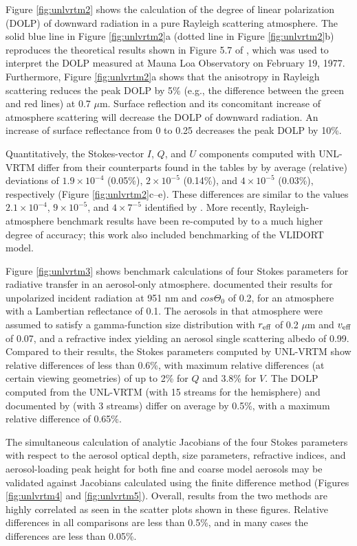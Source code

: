 Figure \ref{fig:unlvrtm2} shows the calculation of the degree of linear 
polarization (DOLP) of downward radiation in a pure Rayleigh scattering 
atmosphere. The solid blue line in Figure \ref{fig:unlvrtm2}a (dotted 
line in Figure \ref{fig:unlvrtm2}b) reproduces the theoretical results 
shown in Figure 5.7 of \citet{Coulson88}, which was used to interpret 
the DOLP measured at Mauna Loa Observatory on February 19, 1977. 
Furthermore, Figure \ref{fig:unlvrtm2}a shows that the anisotropy in
Rayleigh scattering reduces the peak DOLP by 5\% (e.g., the difference
between the green and red lines) at 0.7 $\mu$m. Surface reflection and its
concomitant increase of atmosphere scattering will decrease the DOLP of
downward radiation. An increase of surface reflectance from 0 to 0.25
decreases the peak DOLP by 10\%.

Quantitatively, the Stokes-vector $I$, $Q$, and $U$ components computed with
UNL-VRTM differ from their counterparts found in the tables by
\citet{Coulson60} by average (relative) deviations of $1.9\times 10^{-4}$
(0.05\%), $2\times 10^{-5}$ (0.14\%), and $4\times 10^{-5}$ (0.03\%), 
respectively (Figure \ref{fig:unlvrtm2}c--e). These
differences are similar to the values $2.1\times 10^{-4}$, $9\times
10^{-5}$, and $4\times 7^{-5}$ identified by \citet{Evans91}. More recently,
Rayleigh-atmosphere benchmark results have been re-computed by
\citet{Vijay12} to a much higher degree of accuracy; this work also
included benchmarking of the VLIDORT model.

Figure \ref{fig:unlvrtm3} shows benchmark calculations of four 
Stokes parameters for radiative transfer in an aerosol-only atmosphere.
\citet{Garcia89} documented their results for unpolarized incident 
radiation at 951 nm and $cos{\Theta_0}$ of 0.2, for an atmosphere with a
Lambertian reflectance of 0.1. The aerosols in that atmosphere were
assumed to satisfy a gamma-function size distribution with $r_\text{eff}$ of
0.2 $\mu$m and $v_\text{eff}$ of 0.07, and a refractive index yielding an 
aerosol single scattering albedo of 0.99. Compared to their results, 
the Stokes parameters computed by UNL-VRTM show relative differences 
of less than 0.6\%, with maximum relative differences 
(at certain viewing geometries) of up to 2\% for $Q$ and 3.8\% for $V$. 
The DOLP computed from the UNL-VRTM (with 15 streams for the hemisphere) 
and documented by \citet{Garcia89} (with 3 streams) differ on average 
by 0.5\%, with a maximum relative difference of 0.65\%.

The simultaneous calculation of analytic Jacobians of the four Stokes
parameters with respect to the aerosol optical depth, size parameters,
refractive indices, and aerosol-loading peak height for both fine and
coarse model aerosols may be validated against Jacobians calculated
using the finite difference method (Figures \ref{fig:unlvrtm4} and
\ref{fig:unlvrtm5}). Overall, results from the two methods are 
highly correlated as seen in the scatter plots
shown in these figures. Relative differences in all comparisons are
less than 0.5\%, and in many cases the differences are less than 0.05\%.

